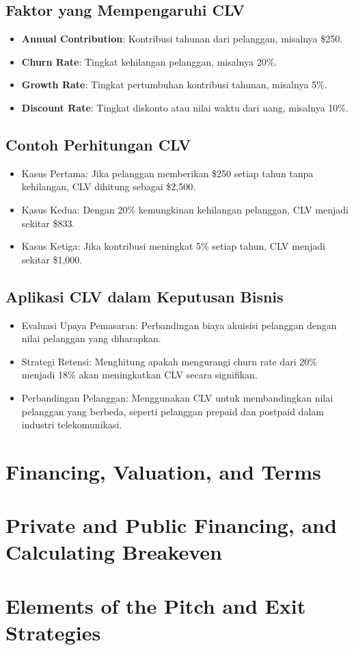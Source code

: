 \documentclass{article}
\begin{document}
\subsection{Faktor yang Mempengaruhi CLV}
\begin{itemize}
    \item \textbf{Annual Contribution}: Kontribusi tahunan dari pelanggan, misalnya \$250.
    \item \textbf{Churn Rate}: Tingkat kehilangan pelanggan, misalnya 20\%.
    \item \textbf{Growth Rate}: Tingkat pertumbuhan kontribusi tahunan, misalnya 5\%.
    \item \textbf{Discount Rate}: Tingkat diskonto atau nilai waktu dari uang, misalnya 10\%.
\end{itemize}

\subsection{Contoh Perhitungan CLV}
\begin{itemize}
    \item Kasus Pertama: Jika pelanggan memberikan \$250 setiap tahun tanpa kehilangan, CLV dihitung sebagai \$2,500.
    \item Kasus Kedua: Dengan 20\% kemungkinan kehilangan pelanggan, CLV menjadi sekitar \$833.
    \item Kasus Ketiga: Jika kontribusi meningkat 5\% setiap tahun, CLV menjadi sekitar \$1,000.
\end{itemize}

\subsection{Aplikasi CLV dalam Keputusan Bisnis}
\begin{itemize}
    \item Evaluasi Upaya Pemasaran: Perbandingan biaya akuisisi pelanggan dengan nilai pelanggan yang diharapkan.
    \item Strategi Retensi: Menghitung apakah mengurangi churn rate dari 20\% menjadi 18\% akan meningkatkan CLV secara signifikan.
    \item Perbandingan Pelanggan: Menggunakan CLV untuk membandingkan nilai pelanggan yang berbeda, seperti pelanggan prepaid dan postpaid dalam industri telekomunikasi.
\end{itemize}


\newpage

\section{Financing, Valuation, and Terms}
\newpage

\section{Private and Public Financing, and Calculating Breakeven}
\newpage

\section{Elements of the Pitch and Exit Strategies}
\newpage
\end{document}
